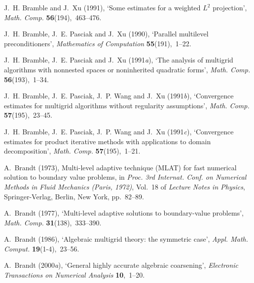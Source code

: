 \documentclass[12pt]{acta_2011xz}
\begin{document}
\begin{thebibliography}{xx}
J.~H. Bramble and J.~Xu  (1991), `Some estimates for a weighted {        $L^2$        }
  projection', {\em Math. Comp.} {\bf 56}(194),~463--476.

J.~H. Bramble, J.~E. Pasciak and J.~Xu  (1990), `Parallel multilevel
  preconditioners', {\em Mathematics of Computation} {\bf 55}(191),~1--22.

J.~H. Bramble, J.~E. Pasciak and J.~Xu  (1991{\em a}), `The analysis of
  multigrid algorithms with nonnested spaces or noninherited quadratic forms',
  {\em Math. Comp.} {\bf 56}(193),~1--34.

J.~H. Bramble, J.~E. Pasciak, J.~P. Wang and J.~Xu  (1991{\em b}), `Convergence
  estimates for multigrid algorithms without regularity assumptions', {\em
  Math. Comp.} {\bf 57}(195),~23--45.

J.~H. Bramble, J.~E. Pasciak, J.~P. Wang and J.~Xu  (1991{\em c}), `Convergence
  estimates for product iterative methods with applications to domain
  decomposition', {\em Math. Comp.} {\bf 57}(195),~1--21.

A.~Brandt  (1973), Multi-level adaptive technique ({M}{L}{A}{T}) for fast
  numerical solution to boundary value problems, in {\em Proc. 3rd Internat.
  Conf. on Numerical Methods in Fluid Mechanics (Paris, 1972)}, Vol.~18 of {\em
  Lecture Notes in Physics}, Springer-Verlag, Berlin, New York, pp.~82--89.

A.~Brandt  (1977), `Multi-level adaptive solutions to boundary-value problems',
  {\em Math. Comp.} {\bf 31}(138),~333--390.

A.~Brandt  (1986), `Algebraic multigrid theory: the symmetric case', {\em Appl.
  Math. Comput.} {\bf 19}(1-4),~23--56.

A.~Brandt  (2000{\em a}), `General highly accurate algebraic coarsening', {\em
  Electronic Transactions on Numerical Analysis} {\bf 10},~1--20.


\end{thebibliography}
\end{document}
